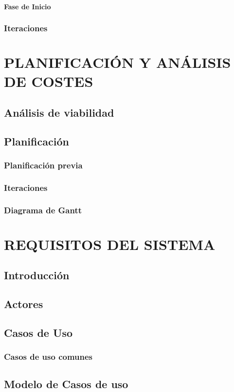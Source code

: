 \documentclass[12pt, a4paper, twoside]{book}
\begin{document}
	\subsubsection{Fase de Inicio}
	\subsection{Iteraciones}
	\chapter{PLANIFICACIÓN Y ANÁLISIS DE COSTES}
	\section{Análisis de viabilidad}
	\section{Planificación}
	\subsection{Planificación previa}
	\subsection{Iteraciones}
	\subsection{Diagrama de Gantt}

	\chapter{REQUISITOS DEL SISTEMA}
	\section{Introducción}
	\section{Actores}
	\section{Casos de Uso}
	\subsection{Casos de uso comunes}		 
	\section{Modelo de Casos de uso}
\end{document}
